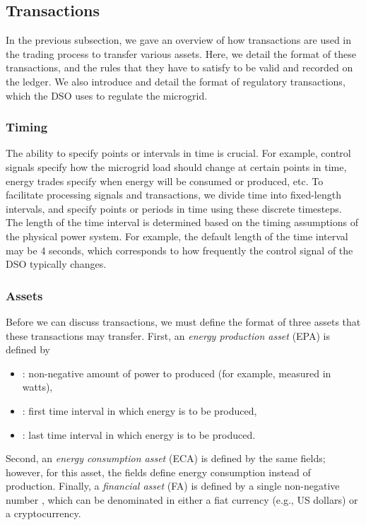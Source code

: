 \subsection{Transactions}

In the previous subsection, we gave an overview of how transactions are used in the trading process to transfer various assets.
Here, we detail the format of these transactions, and the rules that they have to satisfy to be valid and recorded on the ledger.
We also introduce and detail the format of regulatory transactions, which the DSO uses to regulate the microgrid.

\subsubsection{Timing}

The ability to specify points or intervals in time is crucial.
For example, control signals specify how the microgrid load should change at certain points in time, energy trades specify when energy will be consumed or produced, etc.
To facilitate processing signals and transactions, we divide time into fixed-length intervals, and specify points or periods in time using these discrete timesteps.
The length of the time interval is determined based on the timing assumptions of the physical power system.
For example, the default length of the time interval may be 4 seconds, which corresponds to how frequently the control signal of the DSO typically changes.

\subsubsection{Assets}

Before we can discuss transactions, we must define the format of three assets that these transactions may transfer.
First, an \emph{energy production asset} (EPA) is defined by
\begin{itemize}[noitemsep,topsep=-\parskip]
\item {}: non-negative amount of power to produced (for example, measured in watts),
\item {}: first time interval in which energy is to be produced,
\item {}: last time interval in which energy is to be produced.
\end{itemize}
\vspace{\parskip}
Second, an \emph{energy consumption asset} (ECA) is defined by the same fields; however, for this asset, the fields define energy consumption instead of production.
Finally, a \emph{financial asset} (FA) is defined by a single non-negative number , which can be denominated in either a fiat currency (e.g., US dollars) or a cryptocurrency.

